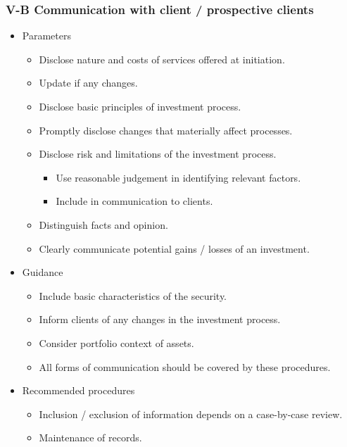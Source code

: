 \documentclass[../notes_compiled.tex]{subfiles}
\begin{document}
\subsubsection{V-B Communication with client / prospective clients}
\begin{itemize}
\item Parameters
\begin{itemize}
\item Disclose nature and costs of services offered at initiation.
\item Update if any changes.
\item Disclose basic principles of investment process.
\item Promptly disclose changes that materially affect processes.
\item Disclose risk and limitations of the investment process.
\begin{itemize}
\item Use reasonable judgement in identifying relevant factors.
\item Include in communication to clients.
\end{itemize}
\item Distinguish facts and opinion.
\item Clearly communicate potential gains / losses of an investment.
\end{itemize}
\item Guidance
\begin{itemize}
\item Include basic characteristics of the security.
\item Inform clients of any changes in the investment process.
\item Consider portfolio context of assets.
\item All forms of communication should be covered by these procedures.
\end{itemize}
\item Recommended procedures
\begin{itemize}
\item Inclusion / exclusion of information depends on a case-by-case review.
\item Maintenance of records.
\end{itemize}
\end{itemize}
\end{document}
